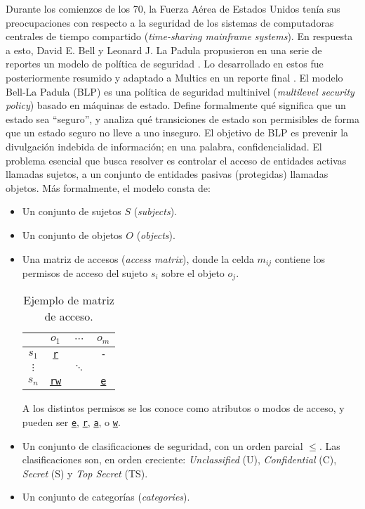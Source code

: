 \documentclass{article}
\theoremstyle{definition}
\begin{document}
Durante los comienzos de los 70, la Fuerza Aérea de Estados Unidos tenía sus
preocupaciones con respecto a la seguridad de los sistemas de computadoras
centrales de tiempo compartido (\textit{time-sharing mainframe systems}). 
En respuesta a esto,  David E. Bell y Leonard J. La Padula propusieron en una serie de reportes un
modelo de política de seguridad \cite{BLP73, BLP73b, Bell74}. Lo desarrollado en estos fue
posteriormente resumido y adaptado a Multics en un reporte final \cite{BLP76}.
El modelo Bell-La Padula (BLP) es una política de seguridad multinivel
(\textit{multilevel security policy}) basado en máquinas de estado.  Define
formalmente qué significa que un estado sea ``seguro'', y analiza qué
transiciones de estado son permisibles de forma que un estado seguro no lleve a
uno inseguro. El objetivo de BLP es prevenir la divulgación indebida de información; en una
palabra, confidencialidad. El problema esencial que busca resolver es controlar
el acceso de entidades activas llamadas sujetos, a un conjunto de entidades
pasivas (protegidas) llamadas objetos. Más formalmente, el modelo consta de:
\begin{itemize}
\itemsep0em 
  \item Un conjunto de sujetos $S$ (\textit{subjects}).
  \item Un conjunto de objetos $O$ (\textit{objects}).
  \item Una matriz de accesos (\textit{access matrix}), donde la celda $m_{ij}$
    contiene los permisos de acceso del sujeto $s_i$ sobre el objeto $o_j$.
    \begin{table}[h!]
      \centering
    \begin{tabular}{c|ccc} 
      & $o_1$ & $\cdots$ & $o_m$ \\ 
     \hline
     $s_1$   & \texttt{\underline{r}}   &    & \verb+-+ \\ 
     $\vdots$     &   & $\ddots$  &  \\ 
     $s_n$ & \texttt{\underline{rw}} &    & \texttt{\underline{e}} \\
    \end{tabular}
    \caption{Ejemplo de matriz de acceso.}
    \end{table}
    
    A
    los distintos permisos se los conoce como atributos o modos de acceso, y
    pueden ser \texttt{\underline{e}}, \texttt{\underline{r}},
    \texttt{\underline{a}}, o \texttt{\underline{w}}.
  \item Un conjunto de clasificaciones de seguridad, con un orden parcial
    $\leq$. Las clasificaciones son, en orden creciente: \textit{Unclassified}
    (U), \textit{Confidential} (C), \textit{Secret} (S) y \textit{Top Secret} (TS).
  \item Un conjunto de categorías (\textit{categories}).
\end{itemize}
\end{document}
